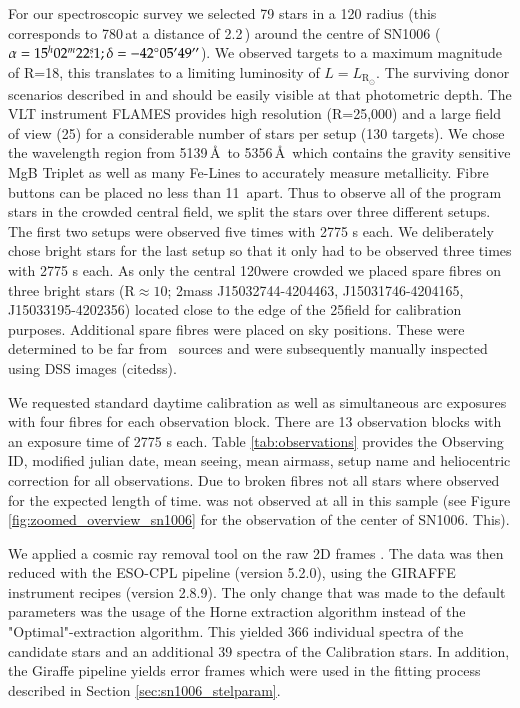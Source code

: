 For our spectroscopic survey we selected 79 stars in a 120 \arcsec radius (this corresponds to 780\,\kms at a distance of 2.2\,\kpc) around the centre of SN1006 ($\alpha = 15^h02^m22\overset{s}{.}1;\delta = -42^{\circ}05\hbox{$^\prime$}49\hbox{$^{\prime\prime}$}$). We observed targets to a maximum magnitude of R=18, this translates to a limiting luminosity of $L=L_{\textrm{R}_\odot}$. The surviving donor scenarios described in \citet{2000ApJS..128..615M} and \citet{2008A&A...489..943P} should be easily visible at that photometric depth. 
The VLT instrument FLAMES provides high resolution (R=25,000) and a large field of view (25\arcmin) for a considerable number of stars per setup (130 targets). We chose the wavelength region from 5139\,\AA\ to 5356\,\AA\ which contains the gravity sensitive MgB Triplet as well as many Fe-Lines to accurately measure metallicity. Fibre buttons can be placed no less than 11\arcsec\ apart. Thus to observe all of the program stars in the crowded central field, we split the stars over three different setups. The first two setups were observed five times with 2775 s each. We deliberately chose bright stars for the last setup so that it only had to be observed three times with 2775 s each. As only the central 120\arcsec were crowded we placed spare fibres on three bright stars (R$\approx 10$; 2mass J15032744-4204463, J15031746-4204165, J15033195-4202356) located close to the edge of the 25\arcmin field for calibration purposes. Additional spare fibres were placed on sky positions. These were determined to be far from \twomass\ sources and were subsequently manually inspected using DSS images (citedss). 

We requested standard daytime calibration as well as simultaneous arc exposures with four fibres for each observation block. There are 13 observation blocks with an exposure time of 2775 s each. Table \ref{tab:observations} provides the Observing ID, modified julian date, mean seeing, mean airmass, setup name and heliocentric correction for all observations. Due to broken fibres not all stars where observed for the expected length of time.  was not observed at all in this sample (see Figure \ref{fig:zoomed_overview_sn1006} for the observation of the center of SN1006. This).

We applied a cosmic ray removal tool on the raw 2D frames \citep{2001PASP..113.1420V}. The data was then reduced with the ESO-CPL pipeline (version 5.2.0), using the GIRAFFE instrument recipes (version 2.8.9). The only change that was made to the default parameters was the usage of the Horne extraction algorithm instead of the "Optimal"-extraction algorithm. This yielded 366 individual spectra of the candidate stars and an additional 39 spectra of the Calibration stars. 
In addition, the Giraffe pipeline yields error frames which were used in the fitting process described in Section \ref{sec:sn1006_stelparam}. 


